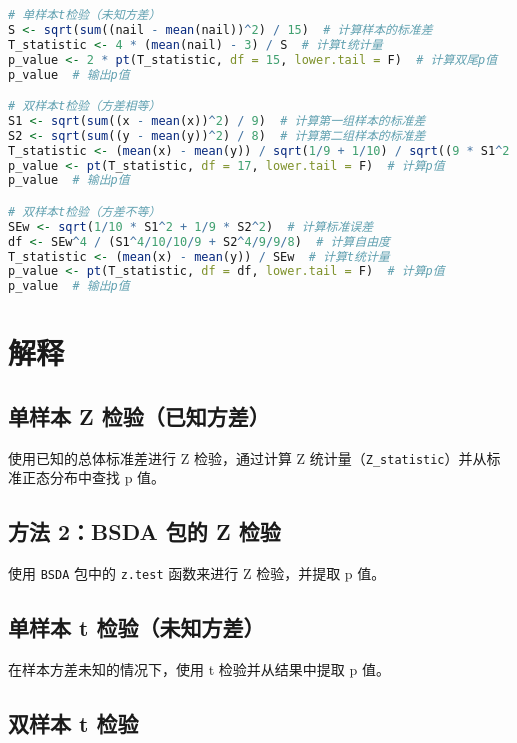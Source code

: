 \documentclass[UTF8]{report}
\theoremstyle{MyLineTheoremStyle} %
\theoremstyle{MyBlockTheoremStyle} %
\theoremstyle{MySubsubsectionStyle} %
\begin{document}
\begin{lstlisting}[language=R]
# 单样本t检验（未知方差）
S <- sqrt(sum((nail - mean(nail))^2) / 15)  # 计算样本的标准差
T_statistic <- 4 * (mean(nail) - 3) / S  # 计算t统计量
p_value <- 2 * pt(T_statistic, df = 15, lower.tail = F)  # 计算双尾p值
p_value  # 输出p值

# 双样本t检验（方差相等）
S1 <- sqrt(sum((x - mean(x))^2) / 9)  # 计算第一组样本的标准差
S2 <- sqrt(sum((y - mean(y))^2) / 8)  # 计算第二组样本的标准差
T_statistic <- (mean(x) - mean(y)) / sqrt(1/9 + 1/10) / sqrt((9 * S1^2 + 8 * S2^2) / 17)  # 计算t统计量
p_value <- pt(T_statistic, df = 17, lower.tail = F)  # 计算p值
p_value  # 输出p值

# 双样本t检验（方差不等）
SEw <- sqrt(1/10 * S1^2 + 1/9 * S2^2)  # 计算标准误差
df <- SEw^4 / (S1^4/10/10/9 + S2^4/9/9/8)  # 计算自由度
T_statistic <- (mean(x) - mean(y)) / SEw  # 计算t统计量
p_value <- pt(T_statistic, df = df, lower.tail = F)  # 计算p值
p_value  # 输出p值


\end{lstlisting}



\section*{解释}

\subsection*{单样本 Z 检验（已知方差）}

使用已知的总体标准差进行 Z 检验，通过计算 Z 统计量（\texttt{Z\_statistic}）并从标准正态分布中查找 p 值。

\subsection*{方法 2：BSDA 包的 Z 检验}

使用 \texttt{BSDA} 包中的 \texttt{z.test} 函数来进行 Z 检验，并提取 p 值。

\subsection*{单样本 t 检验（未知方差）}

在样本方差未知的情况下，使用 t 检验并从结果中提取 p 值。

\subsection*{双样本 t 检验}
\end{document}
